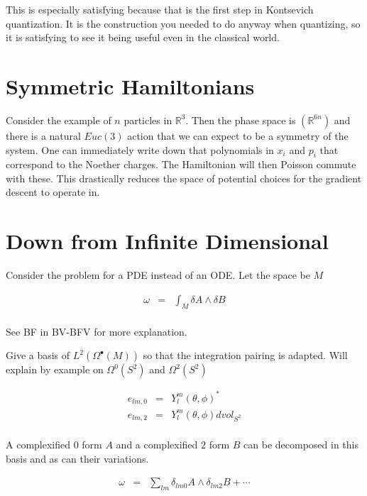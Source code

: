 \documentclass[a4paper,landscape]{article}
\theoremstyle{change}
\theoremstyle{nonumberplain}
\numberwithin{equation}{section}
\begin{document}
This is especially satisfying because that is the first step in Kontsevich quantization. It is the construction you needed to do anyway when quantizing, so it is satisfying to see it being useful even in the classical world.

\section{Symmetric Hamiltonians}

Consider the example of $n$ particles in $\mathbb{R}^3$. Then the phase space is $(\mathbb{R}^{6n})$ and there is a natural $Euc(3)$ action that we can expect to be a symmetry of the system. One can immediately write down that polynomials in $x_i$ and $p_i$ that correspond to the Noether charges. The Hamiltonian will then Poisson commute with these. This drastically reduces the space of potential choices for the gradient descent to operate in.

\section{Down from Infinite Dimensional}

Consider the problem for a PDE instead of an ODE. Let the space be $M$

\begin{eqnarray*}
\omega &=& \int_M \delta A \wedge \delta B\\
\end{eqnarray*}

See BF in BV-BFV for more explanation.

Give a basis of $L^2 ( \Omega^\bullet (M))$ so that the integration pairing is adapted. Will explain by example on $\Omega^0 (S^2)$ and $\Omega^2 (S^2)$

\begin{eqnarray*}
e_{lm,0} &=& Y_l^m (\theta , \phi)^*\\
e_{lm,2} &=& Y_l^m (\theta , \phi) dvol_{S^2}\\
\end{eqnarray*}

A complexified $0$ form $A$ and a complexified $2$ form $B$ can be decomposed in this basis and as can their variations.

\begin{eqnarray*}
\omega &=& \sum_{lm} \delta_{lm0} A \wedge \delta_{lm2} B + \cdots\\
\end{eqnarray*}
\end{document}

